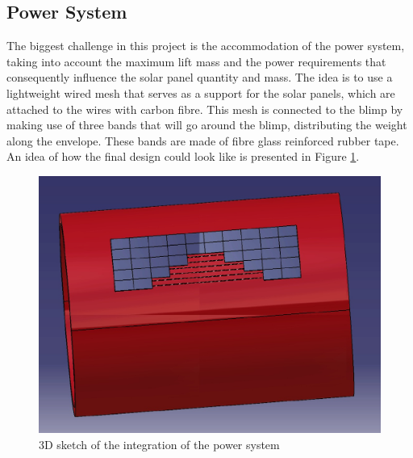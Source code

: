 \subsection{Power System}
%
The biggest challenge in this project is the accommodation of the power system, taking into account the maximum lift mass and the power requirements that consequently influence the solar panel quantity and mass. The idea is to use a lightweight wired mesh that serves as a support for the solar panels, which are attached to the wires with carbon fibre. This mesh is connected to the blimp by making use of three bands that will go around the blimp, distributing the weight along the envelope. These bands are made of fibre glass reinforced rubber tape. An idea of how the final design could look like is presented in Figure \ref{fig:mesh}.
%
%
\begin{figure}[bht]
\centering
\includegraphics[scale=0.4]{figures/mesh.jpg}
\caption{3D sketch of the integration of the power system}
\label{fig:mesh}
\end{figure}
%
